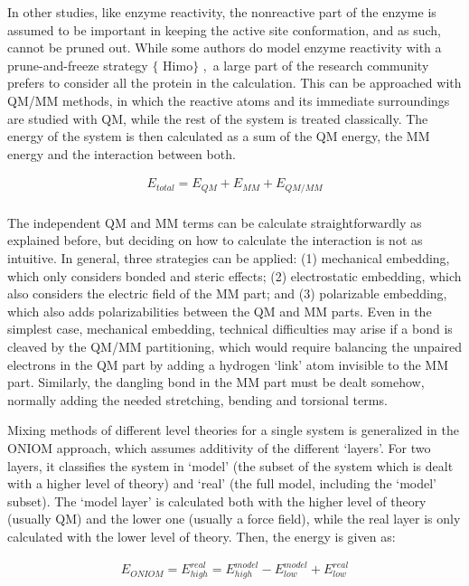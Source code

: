 In other studies, like enzyme reactivity, the nonreactive part of the enzyme is assumed to be important in keeping the active site conformation, and as such, cannot be pruned out. While some authors do model enzyme reactivity with a prune-and-freeze strategy $ \{ $ Himo$ \} $ ,\ a large part of the research community prefers to consider all the protein in the calculation.  This can be approached with QM/MM methods, in which the reactive atoms and its immediate surroundings are studied with QM, while the rest of the system is treated classically. The energy of the system is then calculated as a sum of the QM energy, the MM energy and the interaction between both.


\begin{align}
	E_{total}=E_{QM}+E_{MM}+E_{QM/MM} \\ \tag{QM/MM energy}
\end{align}


The independent QM and MM terms can be calculate straightforwardly as explained before, but deciding on how to calculate the interaction is not as intuitive. In general, three strategies can be applied: (1) mechanical embedding, which only considers bonded and steric effects; (2) electrostatic embedding, which also considers the electric field of the MM part; and (3) polarizable embedding, which also adds polarizabilities between the QM and MM parts. Even in the simplest case, mechanical embedding, technical difficulties may arise if a bond is cleaved by the QM/MM partitioning, which would require balancing the unpaired electrons in the QM part by adding a hydrogen ‘link’ atom invisible to the MM part. Similarly, the dangling bond in the MM part must be dealt somehow, normally adding the needed stretching, bending and torsional terms.

Mixing methods of different level theories for a single system is generalized in the ONIOM approach, which assumes additivity of the different ‘layers’. For two layers, it classifies the system in ‘model’ (the subset of the system which is dealt with a higher level of theory) and ‘real’ (the full model, including the ‘model’ subset). The ‘model layer’ is calculated both with the higher level of theory (usually QM) and the lower one (usually a force field), while the real layer is only calculated with the lower level of theory. Then, the energy is given as:

\begin{align}
  E_{ONIOM}=E_{high}^{real}=E_{high}^{model}-E_{low}^{model}+E_{low}^{real} \\ \tag{ONIOM energy}
\end{align}


